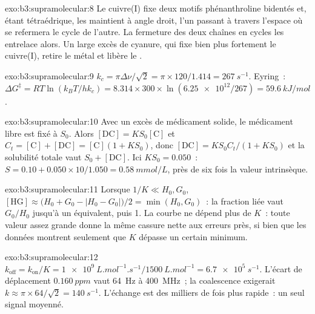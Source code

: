 \begin{solution}{exo:b3:supramolecular:8}
Le cuivre(I) fixe deux motifs phénanthroline bidentés et, étant
tétraédrique, les maintient à angle droit, l'un passant à travers l'espace
où se refermera le cycle de l'autre. La fermeture des deux chaînes en
cycles les entrelace alors. Un large excès de cyanure, qui fixe bien plus
fortement le cuivre(I), retire le métal et libère le .
\end{solution}

\begin{solution}{exo:b3:supramolecular:9}
$k_c = \pi\Delta\nu/\sqrt2 = \pi \times 120/1.414 = \qty{267}{s^{-1}}$. Eyring~:
$\Delta G^\ddagger = RT\ln(k_BT/hk_c) = 8.314 \times 300 \times \ln(\num{6.25e12}/267) = \qty{59.6}{kJ/mol}$.
\end{solution}

\begin{solution}{exo:b3:supramolecular:10}
Avec un excès de médicament solide, le médicament libre est fixé à $S_0$. Alors $[\mathrm{DC}] = KS_0[\mathrm C]$ et
$C_t = [\mathrm C] + [\mathrm{DC}] = [\mathrm C](1 + KS_0)$, donc $[\mathrm{DC}] = KS_0C_t/(1 + KS_0)$ et la solubilité totale vaut $S_0 + [\mathrm{DC}]$. Ici
$KS_0 = 0.050$~: $S = 0.10 + 0.050 \times 10/1.050 = \qty{0.58}{mmol/L}$, près de six fois la valeur intrinsèque.
\end{solution}

\begin{solution}{exo:b3:supramolecular:11}
Lorsque $1/K \ll H_0, G_0$, $[\mathrm{HG}] \approx \bigl(H_0 + G_0 - |H_0 - G_0|\bigr)/2 = \min(H_0, G_0)$~: la fraction liée vaut $G_0/H_0$ jusqu'à un
équivalent, puis 1. La courbe ne dépend plus de $K$~: toute valeur assez
grande donne la même cassure nette aux erreurs près, si bien que les
données montrent seulement que $K$ dépasse un certain minimum.
\end{solution}

\begin{solution}{exo:b3:supramolecular:12}
$k_{\mathrm{off}} = k_{\mathrm{on}}/K = \qty{1e9}{L.mol^{-1}.s^{-1}}/\qty{1500}{L.mol^{-1}} = \qty{6.7e5}{s^{-1}}$. L'écart de déplacement
$\qty{0.160}{ppm}$ vaut \qty{64}{Hz} à \qty{400}{MHz}~; la coalescence exigerait $k \approx \pi \times 64/\sqrt2 = \qty{140}{s^{-1}}$. L'échange est
des milliers de fois plus rapide~: un seul signal moyenné.
\end{solution}

